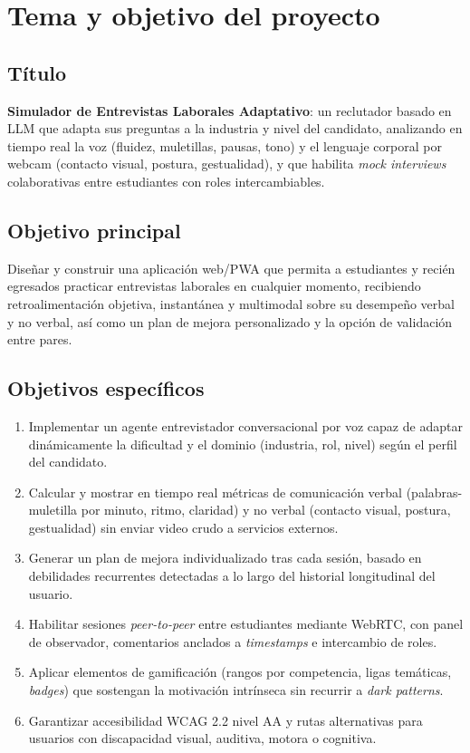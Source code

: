 \section{Tema y objetivo del proyecto}
\label{sec:tema}

\subsection{Título}
\textbf{Simulador de Entrevistas Laborales Adaptativo}: un reclutador basado en
LLM que adapta sus preguntas a la industria y nivel del candidato, analizando
en tiempo real la voz (fluidez, muletillas, pausas, tono) y el lenguaje
corporal por webcam (contacto visual, postura, gestualidad), y que habilita
\textit{mock interviews} colaborativas entre estudiantes con roles
intercambiables.

\subsection{Objetivo principal}
Diseñar y construir una aplicación web/PWA que permita a estudiantes y
recién egresados practicar entrevistas laborales en cualquier momento,
recibiendo retroalimentación objetiva, instantánea y multimodal sobre su
desempeño verbal y no verbal, así como un plan de mejora personalizado y la
opción de validación entre pares.

\subsection{Objetivos específicos}
\begin{enumerate}
  \item Implementar un agente entrevistador conversacional por voz capaz de
        adaptar dinámicamente la dificultad y el dominio (industria, rol,
        nivel) según el perfil del candidato.
  \item Calcular y mostrar en tiempo real métricas de comunicación verbal
        (palabras-muletilla por minuto, ritmo, claridad) y no verbal
        (contacto visual, postura, gestualidad) sin enviar video crudo a
        servicios externos.
  \item Generar un plan de mejora individualizado tras cada sesión, basado
        en debilidades recurrentes detectadas a lo largo del historial
        longitudinal del usuario.
  \item Habilitar sesiones \textit{peer-to-peer} entre estudiantes mediante
        WebRTC, con panel de observador, comentarios anclados a
        \textit{timestamps} e intercambio de roles.
  \item Aplicar elementos de gamificación (rangos por competencia, ligas
        temáticas, \textit{badges}) que sostengan la motivación intrínseca
        sin recurrir a \textit{dark patterns}.
  \item Garantizar accesibilidad WCAG 2.2 nivel AA y rutas alternativas para
        usuarios con discapacidad visual, auditiva, motora o cognitiva.
\end{enumerate}

